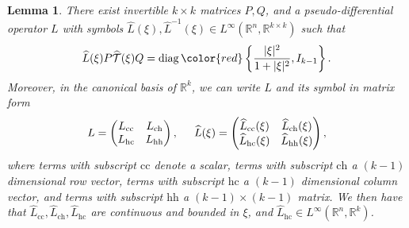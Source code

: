 \documentclass[10pt]{article}
\newtheorem{Lemma}{Lemma}[section]
\newcommand{\R}{\mathbb{R}}
\newcommand{\That}{\widehat{\mathcal{T}}}
\newcommand{\diag}{\operatorname{diag}}
\begin{document}
\begin{Lemma}\label{Lem1} There exist invertible $k \times k$ matrices $P, Q$, and a pseudo-differential operator $L$ with symbols $\widehat{L}(\xi),\widehat{L}^{-1}(\xi) \in L^\infty(\R^n, \R^{k\times k}) $ such that 
\[
\widehat{L}(\xi)P\That(\xi)Q = \diag\color{red}\left\{\dfrac{|\xi|^2}{1+|\xi|^2},I_{k-1} \right\}.
\]
Moreover, in the canonical basis of $\R^k$, we can write $L$ and its symbol in matrix form
\[
L  = \begin{pmatrix}
L_\mathrm{cc} & L_\mathrm{ch} \\
L_\mathrm{hc} & L_\mathrm{hh} 
\end{pmatrix}, \hspace{0.2in}
\widehat{L}(\xi)  = \begin{pmatrix}
\widehat{L}_\mathrm{cc}(\xi) & \widehat{L}_\mathrm{ch}(\xi) \\
\widehat{L}_\mathrm{hc}(\xi) & \widehat{L}_\mathrm{hh}(\xi) 
\end{pmatrix},
\]
where terms with subscript $\mathrm{cc}$ denote a scalar, terms with subscript $\mathrm{ch}$ a $(k-1)$ dimensional row vector, terms with subscript $\mathrm{hc}$ a $(k-1)$ dimensional column vector, and terms with subscript $\mathrm{hh}$ a $(k-1)\times (k-1)$ matrix. We then have that $\widehat{L}_\mathrm{cc},\widehat{L}_\mathrm{ch},\widehat{L}_\mathrm{hc}$ are continuous and bounded in $\xi$, and $\widehat{L}_\mathrm{hc} \in L^\infty(\R^n, \R^k)$.
\end{Lemma}
\end{document}
